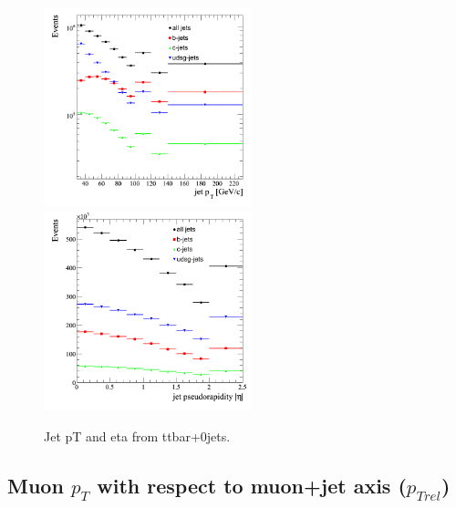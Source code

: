\begin{figure}[htbp]
  \begin{center}
    \includegraphics[width=60mm]{Figures/jet_pt_tt0j.png}
    \includegraphics[width=60mm]{Figures/jet_eta_tt0j.png}
  \end{center}
  \caption{Jet pT and eta from ttbar+0jets.}
  \label{fig:jet_pt_QCD}
\end{figure}

\clearpage

\subsection{Muon $p_T$ with respect to muon+jet axis ($p_{Trel}$)}

